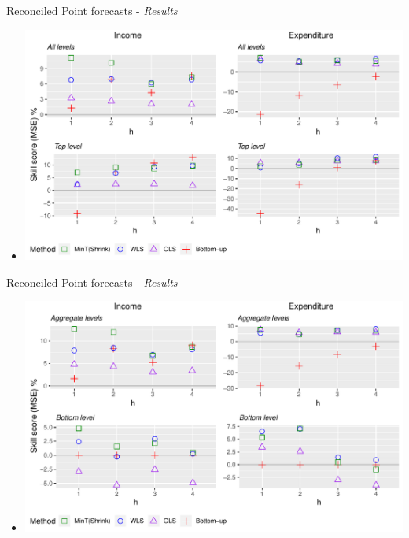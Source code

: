 \documentclass[11pt,xcolor=dvipsnames,table]{beamer} %
\begin{document}
\begin{frame}{Reconciled Point forecasts - \textit{Results}}
\begin{itemize}[<+-| alert@+>]
	\item[] 
	\tiny
	\centering
		\includegraphics[scale=0.55]{Figs/Results/PointF_MSE_AllandToplevel.pdf}
	
	
\end{itemize}
\end{frame}



\begin{frame}{Reconciled Point forecasts - \textit{Results}}
\begin{itemize}[<+-| alert@+>]
	\item[] 
	\tiny
	\centering
	\includegraphics[scale=0.55]{Figs/Results/PointF_MSE_AggandDisagg.pdf}
	
	
\end{itemize}
\end{frame}
\end{document}
